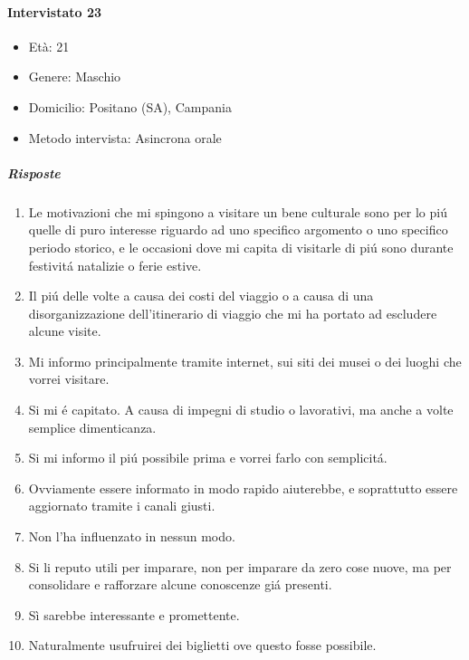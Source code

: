 \documentclass{article}
\begin{document}
\paragraph{Intervistato 23}
\begin{itemize}
\item Età: 21
\item Genere: Maschio
\item Domicilio: Positano (SA), Campania
\item Metodo intervista: Asincrona orale
\end{itemize}
\subparagraph{Risposte}
\begin{enumerate}
\item Le motivazioni che mi spingono a visitare un bene culturale sono per lo piú quelle di puro interesse riguardo ad uno specifico argomento o uno specifico periodo storico, e le occasioni dove mi capita di visitarle di piú sono durante festivitá natalizie o ferie estive.
\item Il piú delle volte a causa dei costi del viaggio o a causa di una disorganizzazione dell'itinerario di viaggio che mi ha portato ad escludere alcune visite.
\item Mi informo principalmente tramite internet, sui siti dei musei o dei luoghi che vorrei visitare.
\item Si mi é capitato. A causa di impegni di studio o lavorativi, ma anche a volte semplice dimenticanza.
\item Si mi informo il piú possibile prima e vorrei farlo con semplicitá.
\item Ovviamente essere informato in modo rapido aiuterebbe, e soprattutto essere aggiornato tramite i canali giusti.
\item Non l'ha influenzato in nessun modo.
\item Si li reputo utili per imparare, non per imparare da zero cose nuove, ma per consolidare e rafforzare alcune conoscenze giá presenti.
\item Sì sarebbe interessante e promettente.
\item Naturalmente usufruirei dei biglietti ove questo fosse possibile.
\end{enumerate}
 
\end{document}
